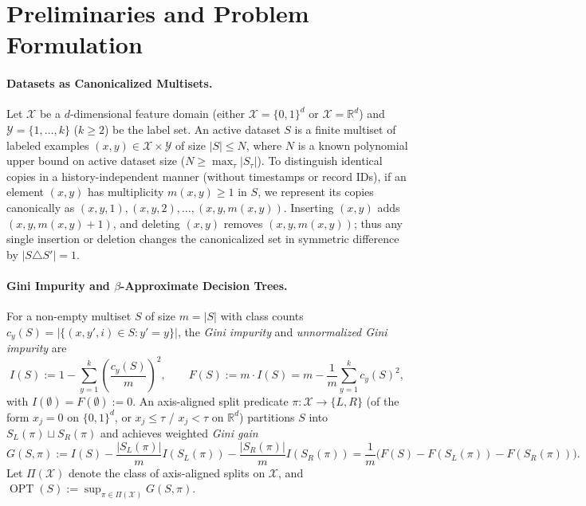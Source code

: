 \documentclass[11pt]{article}
\theoremstyle{definition}
\newcommand{\R}{\mathbb{R}}
\newcommand{\calX}{\mathcal{X}}
\newcommand{\calY}{\mathcal{Y}}
\newcommand{\OPT}{\operatorname{OPT}}
\begin{document}
\section{Preliminaries and Problem Formulation}

\paragraph{Datasets as Canonicalized Multisets.}
Let $\calX$ be a $d$-dimensional feature domain (either $\calX = \{0,1\}^d$ or $\calX = \R^d$) and $\calY = \{1, \dots, k\}$ ($k \ge 2$) be the label set. An active dataset $S$ is a finite multiset of labeled examples $(x, y) \in \calX \times \calY$ of size $|S| \le N$, where $N$ is a known polynomial upper bound on active dataset size ($N \ge \max_\tau |S_\tau|$). To distinguish identical copies in a history-independent manner (without timestamps or record IDs), if an element $(x, y)$ has multiplicity $m(x, y) \ge 1$ in $S$, we represent its copies canonically as $(x, y, 1), (x, y, 2), \dots, (x, y, m(x, y))$. Inserting $(x, y)$ adds $(x, y, m(x, y)+1)$, and deleting $(x, y)$ removes $(x, y, m(x, y))$; thus any single insertion or deletion changes the canonicalized set in symmetric difference by $|S \triangle S'| = 1$.

\paragraph{Gini Impurity and $\beta$-Approximate Decision Trees.}
For a non-empty multiset $S$ of size $m = |S|$ with class counts $c_y(S) = |\{(x, y', i) \in S : y' = y\}|$, the \emph{Gini impurity} and \emph{unnormalized Gini impurity} are
\[
    I(S) := 1 - \sum_{y=1}^k \left(\frac{c_y(S)}{m}\right)^2, \qquad F(S) := m \cdot I(S) = m - \frac{1}{m}\sum_{y=1}^k c_y(S)^2,
\]
with $I(\emptyset) = F(\emptyset) := 0$. An axis-aligned split predicate $\pi : \calX \to \{L, R\}$ (of the form $x_j = 0$ on $\{0,1\}^d$, or $x_j \le \tau$ / $x_j < \tau$ on $\R^d$) partitions $S$ into $S_L(\pi) \sqcup S_R(\pi)$ and achieves weighted \emph{Gini gain}
\[
    G(S, \pi) := I(S) - \frac{|S_L(\pi)|}{m} I(S_L(\pi)) - \frac{|S_R(\pi)|}{m} I(S_R(\pi)) = \frac{1}{m}\big(F(S) - F(S_L(\pi)) - F(S_R(\pi))\big).
\]
Let $\Pi(\calX)$ denote the class of axis-aligned splits on $\calX$, and $\OPT(S) := \sup_{\pi \in \Pi(\calX)} G(S, \pi)$.
\end{document}
